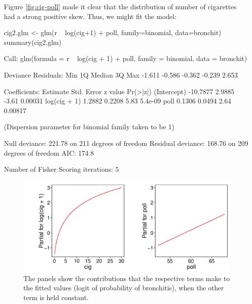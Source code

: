 Figure \ref{fig:cig-poll} made it clear
that the distribution of number of cigarettes had a strong positive
skew.  Thus, we might fit the model:
\begin{fullwidth}
\begin{Schunk}
\begin{Sinput}
cig2.glm <- glm(r ~ log(cig+1) + poll, family=binomial, data=bronchit)
summary(cig2.glm)
\end{Sinput}
\begin{Soutput}

Call:
glm(formula = r ~ log(cig + 1) + poll, family = binomial, data = bronchit)

Deviance Residuals: 
   Min      1Q  Median      3Q     Max  
-1.611  -0.586  -0.362  -0.239   2.653  

Coefficients:
             Estimate Std. Error z value Pr(>|z|)
(Intercept)  -10.7877     2.9885   -3.61  0.00031
log(cig + 1)   1.2882     0.2208    5.83  5.4e-09
poll           0.1306     0.0494    2.64  0.00817

(Dispersion parameter for binomial family taken to be 1)

    Null deviance: 221.78  on 211  degrees of freedom
Residual deviance: 168.76  on 209  degrees of freedom
AIC: 174.8

Number of Fisher Scoring iterations: 5
\end{Soutput}
\end{Schunk}
\end{fullwidth}

\begin{figure}[h]
\begin{Schunk}


\centerline{\includegraphics[width=\textwidth]{figs/8-cig2-tplot-1} }

\end{Schunk}
\caption{The panels show the contributions that the respective terms
  make to the fitted values (logit of probability of bronchitis), when
  the other term is held constant.\label{fig:xy-cig}}
\end{figure}


